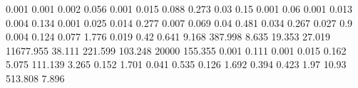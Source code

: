 0.001      0.001      %
0.002      0.056      %
0.001      0.015      %
0.088      0.273      %
0.03       0.15       %
0.001      0.06       %
0.001      0.013      %
0.004      0.134      %
0.001      0.025      %
0.014      0.277      %
0.007      0.069      %
0.04       0.481      %
0.034      0.267      %
0.027      0.9        %
0.004      0.124      %
0.077      1.776      %
0.019      0.42       %
0.641      9.168      %
387.998    8.635      %
19.353     27.019     %
11677.955  38.111     %
221.599    103.248    %
20000      155.355    %
0.001      0.111      %
0.001      0.015      %
0.162      5.075      %
111.139    3.265      %
0.152      1.701      %
0.041      0.535      %
0.126      1.692      %
0.394      0.423      %
1.97       10.93      %
513.808    7.896      %

